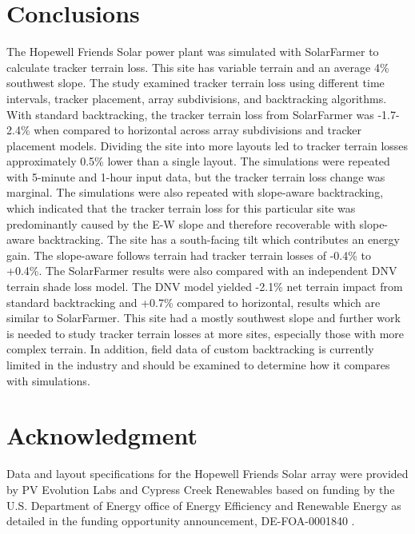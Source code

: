 \documentclass[conference]{IEEEtran}
\begin{document}
\section{Conclusions}
The Hopewell Friends Solar power plant was simulated with SolarFarmer to calculate tracker terrain loss. This site has variable terrain and an average 4\% southwest slope. The study examined tracker terrain loss using different time intervals, tracker placement, array subdivisions, and backtracking algorithms. With standard backtracking, the tracker terrain loss from SolarFarmer was -1.7-2.4\% when compared to horizontal across array subdivisions and tracker placement models. Dividing the site into more layouts led to tracker terrain losses approximately 0.5\% lower than a single layout. The simulations were repeated with 5-minute and 1-hour input data, but the tracker terrain loss change was marginal. The simulations were also repeated with slope-aware backtracking, which indicated that the tracker terrain loss for this particular site was predominantly caused by the E-W slope and therefore recoverable with slope-aware backtracking. The site has a south-facing tilt which contributes an energy gain. The slope-aware follows terrain had tracker terrain losses of -0.4\% to +0.4\%. The SolarFarmer results were also compared with an independent DNV terrain shade loss model. The DNV model yielded -2.1\% net terrain impact from standard backtracking and +0.7\% compared to horizontal, results which are similar to SolarFarmer. This site had a mostly southwest slope and further work is needed to study tracker terrain losses at more sites, especially those with more complex terrain. In addition, field data of custom backtracking is currently limited in the industry and should be examined to determine how it compares with simulations.

\section*{Acknowledgment}

Data and layout specifications for the Hopewell Friends Solar array were provided by PV Evolution Labs and Cypress Creek Renewables based on funding by the U.S. Department of Energy office of Energy Efficiency and Renewable Energy as detailed in the funding opportunity announcement, DE-FOA-0001840 \cite{CypressCreekRenewables2019}.



\end{document}
